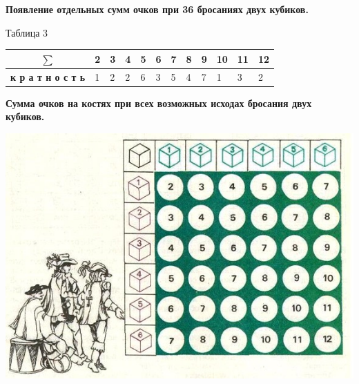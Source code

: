 \begin{flushleft}
{\bf Появление отдельных сумм очков при 36 бросаниях двух кубиков.} 
\end{flushleft}

\begin{flushright}
Таблица 3
\end{flushright}

\begin{center}
\begin{tabularx}{\textwidth}{| c | X | X | X | X | X | X | X | X | X | X | X |}
\hline
$\sum$ & 2 & 3 & 4 & 5 & 6 & 7 & 8 & 9 & 10 & 11 & 12 \\ \hline
{\bf к р а т н о с т ь} & 1 & 2 & 2 & 6 & 3 & 5 & 4 & 7 & 1 & 3 & 2 \\ \hline
\end{tabularx}


\end{center}
 

\begin{flushleft}
{\bf Сумма очков на костях при всех возможных исходах бросания двух кубиков.}
\end{flushleft}

\begin{center}
\includegraphics[scale=0.9]{img.jpg}
\end{center}

